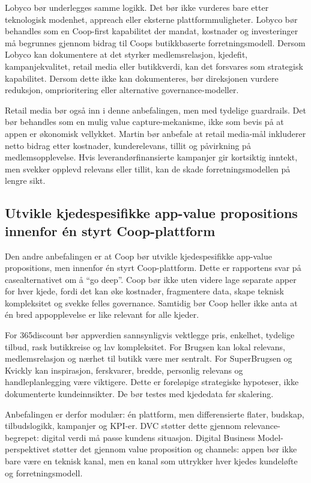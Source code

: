 \documentclass[12pt,a4paper]{article}
\begin{document}
Lobyco bør underlegges samme logikk. Det bør ikke vurderes bare etter teknologisk modenhet, appreach eller eksterne plattformmuligheter. Lobyco bør behandles som en Coop-first kapabilitet der mandat, kostnader og investeringer må begrunnes gjennom bidrag til Coops butikkbaserte forretningsmodell. Dersom Lobyco kan dokumentere at det styrker medlemsrelasjon, kjedefit, kampanjekvalitet, retail media eller butikkverdi, kan det forsvares som strategisk kapabilitet. Dersom dette ikke kan dokumenteres, bør direksjonen vurdere reduksjon, omprioritering eller alternative governance-modeller.

Retail media bør også inn i denne anbefalingen, men med tydelige guardrails. Det bør behandles som en mulig value capture-mekanisme, ikke som bevis på at appen er økonomisk vellykket. Martin bør anbefale at retail media-mål inkluderer netto bidrag etter kostnader, kunderelevans, tillit og påvirkning på medlemsopplevelse. Hvis leverandørfinansierte kampanjer gir kortsiktig inntekt, men svekker opplevd relevans eller tillit, kan de skade forretningsmodellen på lengre sikt.

\subsection{Utvikle kjedespesifikke app-value propositions innenfor én styrt Coop-plattform}

Den andre anbefalingen er at Coop bør utvikle kjedespesifikke app-value propositions, men innenfor én styrt Coop-plattform. Dette er rapportens svar på casealternativet om å ``go deep''. Coop bør ikke uten videre lage separate apper for hver kjede, fordi det kan øke kostnader, fragmentere data, skape teknisk kompleksitet og svekke felles governance. Samtidig bør Coop heller ikke anta at én bred appopplevelse er like relevant for alle kjeder.

For 365discount bør appverdien sannsynligvis vektlegge pris, enkelhet, tydelige tilbud, rask butikkreise og lav kompleksitet. For Brugsen kan lokal relevans, medlemsrelasjon og nærhet til butikk være mer sentralt. For SuperBrugsen og Kvickly kan inspirasjon, ferskvarer, bredde, personlig relevans og handleplanlegging være viktigere. Dette er foreløpige strategiske hypoteser, ikke dokumenterte kundeinnsikter. De bør testes med kjededata før skalering.

Anbefalingen er derfor modulær: én plattform, men differensierte flater, budskap, tilbudslogikk, kampanjer og KPI-er. DVC støtter dette gjennom relevance-begrepet: digital verdi må passe kundens situasjon. Digital Business Model-perspektivet støtter det gjennom value proposition og channels: appen bør ikke bare være en teknisk kanal, men en kanal som uttrykker hver kjedes kundeløfte og forretningsmodell.
\end{document}

